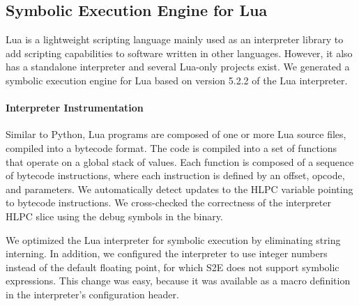 \subsection{Symbolic Execution Engine for Lua}
\label{sec:eval:lua-proto}

Lua is a lightweight scripting language mainly used as an interpreter library to add scripting capabilities to software written in other languages. However, it also has a standalone interpreter and several Lua-only projects exist. We generated a symbolic execution engine for Lua based on version 5.2.2 of the Lua interpreter.

\paragraph{Interpreter Instrumentation}

Similar to Python, Lua programs are composed of one or more Lua source files, compiled into a bytecode format.  The code is compiled into a set of functions that operate on a global stack of values.  Each function is composed of a sequence of bytecode instructions, where each instruction is defined by an offset, opcode, and parameters.
%
We automatically detect updates to the HLPC variable pointing to bytecode instructions.  We cross-checked the correctness of the interpreter HLPC slice using the debug symbols in the binary.

We optimized the Lua interpreter for symbolic execution by eliminating string interning.  In addition, we configured the interpreter to use integer numbers instead of the default floating point, for which S2E does not support symbolic expressions.  This change was easy, because it was available as a macro definition in the interpreter's configuration header.

